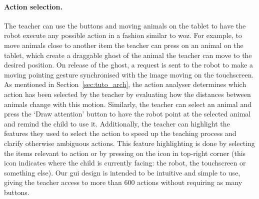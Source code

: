 \paragraph{Action selection.} The teacher can use the buttons and moving animals on the tablet to have the robot execute any possible action in a fashion similar to \gls{woz}. For example, to move animals close to another item the teacher can press on an animal on the tablet, which create a draggable ghost of the animal the teacher can move to the desired position. On release of the ghost, a request is sent to the robot to make a moving pointing gesture synchronised with the image moving on the touchscreen.
As mentioned in Section~\ref{sec:tuto_arch}, the action analyser determines which action has been selected by the teacher by evaluating how the distances between animals change with this motion. Similarly, the teacher can select an animal and press the `Draw attention' button to have the robot point at the selected animal and remind the child to use it.
Additionally, the teacher can highlight the features they used to select the action to speed up the teaching process and clarify otherwise ambiguous actions. This feature highlighting is done by selecting the items relevant to action or by pressing on the icon in top-right corner (this icon indicates where the child is currently facing: the robot, the touchscreen or something else).
Our \gls{gui} design is intended to be intuitive and simple to use, giving the teacher access to more than 600 actions without requiring as many buttons. %

